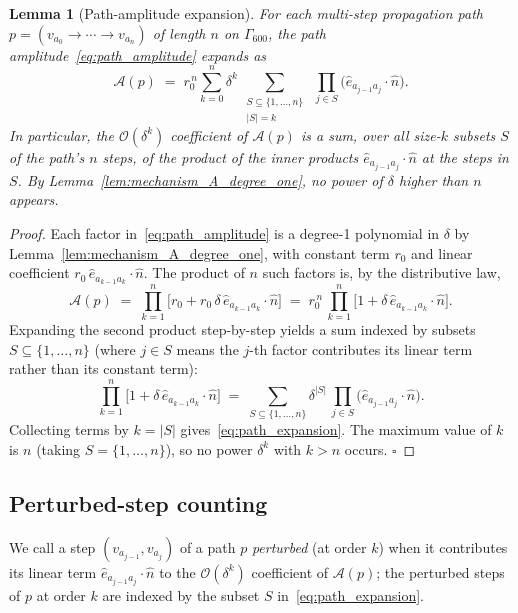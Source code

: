 \documentclass[11pt,letterpaper]{article}
\newtheorem{lemma}[theorem]{Lemma}
\newcommand{\nhat}{\hat{n}}
\newcommand{\Eorder}[1]{\mathcal{O}(\delta^{#1})}
\newcommand{\Gsixcell}{\Gamma_{600}}
\begin{document}
\begin{lemma}[Path-amplitude expansion]\label{lem:path_expansion}
For each multi-step propagation path $p = (v_{a_0} \to \cdots \to v_{a_n})$ of length $n$ on $\Gsixcell$, the path amplitude~\eqref{eq:path_amplitude} expands as
\begin{equation}\label{eq:path_expansion}
\mathcal{A}(p) \;=\; r_0^{\,n}\sum_{k=0}^{n}\delta^k \,
\sum_{\substack{S \subseteq \{1,\ldots,n\} \\ |S| = k}}\;\prod_{j \in S}\bigl(\hat{e}_{a_{j-1} a_j}\cdot\nhat\bigr).
\end{equation}
In particular, the $\Eorder{k}$ coefficient of $\mathcal{A}(p)$ is a sum, over all size-$k$ subsets $S$ of the path's $n$ steps, of the product of the inner products $\hat{e}_{a_{j-1} a_j}\cdot\nhat$ at the steps in $S$. By Lemma~\ref{lem:mechanism_A_degree_one}, no power of $\delta$ higher than $n$ appears.
\end{lemma}

\begin{proof}
Each factor in~\eqref{eq:path_amplitude} is a degree-1 polynomial in $\delta$ by Lemma~\ref{lem:mechanism_A_degree_one}, with constant term $r_0$ and linear coefficient $r_0\,\hat{e}_{a_{k-1} a_k}\cdot\nhat$. The product of $n$ such factors is, by the distributive law,
\[
\mathcal{A}(p) \;=\; \prod_{k=1}^{n} \bigl[r_0 + r_0\,\delta\,\hat{e}_{a_{k-1} a_k}\cdot\nhat\bigr]
\;=\; r_0^{\,n}\,\prod_{k=1}^{n} \bigl[1 + \delta\,\hat{e}_{a_{k-1} a_k}\cdot\nhat\bigr].
\]
Expanding the second product step-by-step yields a sum indexed by subsets $S \subseteq \{1,\ldots,n\}$ (where $j \in S$ means the $j$-th factor contributes its linear term rather than its constant term):
\[
\prod_{k=1}^{n} \bigl[1 + \delta\,\hat{e}_{a_{k-1} a_k}\cdot\nhat\bigr]
\;=\;
\sum_{S \subseteq \{1,\ldots,n\}} \delta^{|S|}\,\prod_{j \in S}\bigl(\hat{e}_{a_{j-1} a_j}\cdot\nhat\bigr).
\]
Collecting terms by $k = |S|$ gives~\eqref{eq:path_expansion}. The maximum value of $k$ is $n$ (taking $S = \{1,\ldots,n\}$), so no power $\delta^{k}$ with $k > n$ occurs. $\square$
\end{proof}

\subsection{Perturbed-step counting}\label{sec:lemma_counting}

We call a step $(v_{a_{j-1}}, v_{a_j})$ of a path $p$ \emph{perturbed} (at order $k$) when it contributes its linear term $\hat{e}_{a_{j-1} a_j}\cdot\nhat$ to the $\Eorder{k}$ coefficient of $\mathcal{A}(p)$; the perturbed steps of $p$ at order $k$ are indexed by the subset $S$ in~\eqref{eq:path_expansion}.
\end{document}
